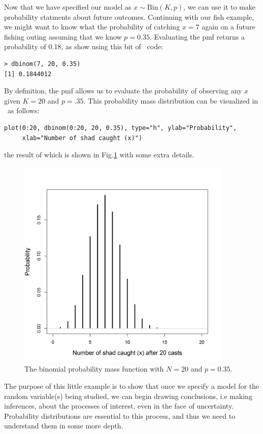 Now that we have specified our model as $x \sim \text{Bin}(K,p)$,
we can use it to make probability statments about future
outcomes. Continuing with our fish example, we might want to know what
the probability of catching $x=7$ again on a future fishing outing
assuming that we know $p=0.35$. Evaluating the pmf returns a
probability of 0.18, as show using this bit of \R~code:
\begin{verbatim}
> dbinom(7, 20, 0.35)
[1] 0.1844012
\end{verbatim}
By definition, the pmf allows us to evaluate the probability of observing
any $x$ given $K=20$ and $p=.35$. This probability mass distribution
can be visualized in \R~as follows:
\begin{verbatim}
plot(0:20, dbinom(0:20, 20, 0.35), type="h", ylab="Probability",
     xlab="Number of shad caught (x)")
\end{verbatim}
the result of which is shown in Fig.\ref{modeling.fig.bin} with some extra details.
\begin{figure}[ht!]
  \centering
  \includegraphics[width=4in,height=4in]{Ch1b/figs/bin}
\caption{The binomial probability mass function with $N=20$ and
  $p=0.35$. }
\label{modeling.fig.bin}
\end{figure}

The purpose of this little example is to show that once we specify a
model for the random variable(s) being studied, we can begin drawing
conclusions, i.e making inferences, about the processes of interest,
even in the face of uncertainty.
Probability distributions are
essential to this process, and thus we need to
understand them in some more depth.


